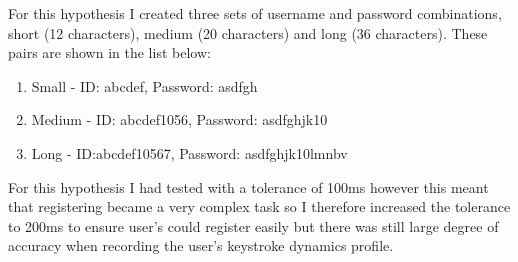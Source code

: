 \documentclass{article}
\begin{document}
For this hypothesis I created three sets of username and password combinations, short (12 characters), medium (20 characters) and long (36 characters). These pairs are shown in the list below: 

\begin{enumerate}
    \item Small - ID: abcdef, Password: asdfgh
    \item Medium - ID: abcdef1056, Password: asdfghjk10
    \item Long - ID:abcdef10567, Password: asdfghjk10lmnbv
\end{enumerate}

For this hypothesis I had tested with a tolerance of 100ms however this meant that registering became a very complex task so I therefore increased the tolerance to 200ms to ensure user's could register easily but there was still large degree of accuracy when recording the user's keystroke dynamics profile. 
\end{document}
